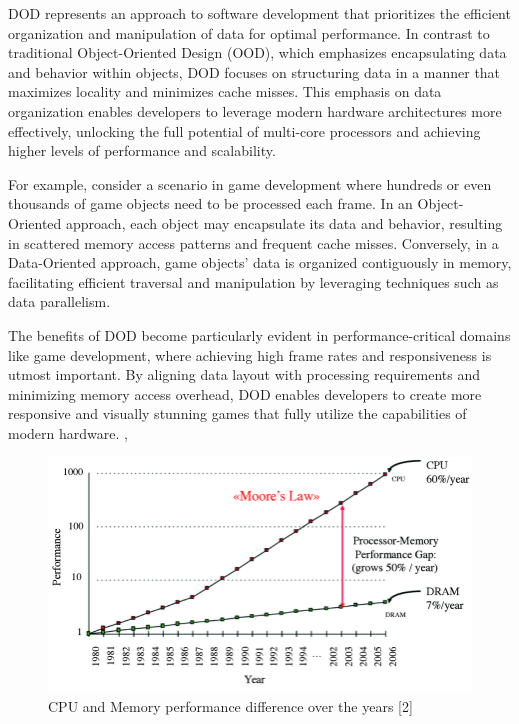 DOD represents an approach to software development that prioritizes the efficient organization and manipulation of data for optimal performance. In contrast to traditional Object-Oriented Design (OOD), which emphasizes encapsulating data and behavior within objects, DOD focuses on structuring data in a manner that maximizes locality and minimizes cache misses. This emphasis on data organization enables developers to leverage modern hardware architectures more effectively, unlocking the full potential of multi-core processors and achieving higher levels of performance and scalability.

For example, consider a scenario in game development where hundreds or even thousands of game objects need to be processed each frame. In an Object-Oriented approach, each object may encapsulate its data and behavior, resulting in scattered memory access patterns and frequent cache misses. Conversely, in a Data-Oriented approach, game objects' data is organized contiguously in memory, facilitating efficient traversal and manipulation by leveraging techniques such as data parallelism.

The benefits of DOD become particularly evident in performance-critical domains like game development, where achieving high frame rates and responsiveness is utmost important. By aligning data layout with processing requirements and minimizing memory access overhead, DOD enables developers to create more responsive and visually stunning games that fully utilize the capabilities of modern hardware. \cite{DOD_in_games}, \cite{DOD_applications_in_games}\newline

\begin{figure}[h]
    \centering
    \includegraphics[scale=0.4]{images/CPUvsMEMORY.png}
    \caption{CPU and Memory performance difference over the years [2]}
    \label{fig:cpu-memory}
\end{figure}

